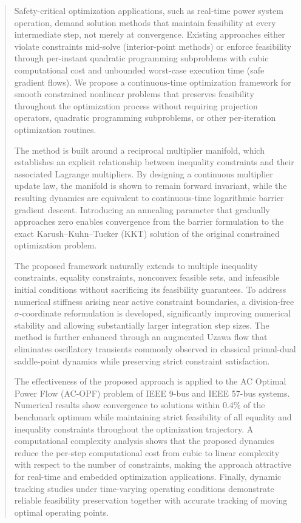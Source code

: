 \documentclass[11pt,onecolumn]{article}
\theoremstyle{definition}
\theoremstyle{remark}
\begin{document}
\begin{abstract}

Safety-critical optimization applications, such as real-time power system operation, demand solution methods that maintain feasibility at every intermediate step, not merely at convergence. Existing approaches either violate constraints mid-solve (interior-point methods) or enforce feasibility through per-instant quadratic programming subproblems with cubic computational cost and unbounded worst-case execution time (safe gradient flows). We propose a continuous-time optimization framework for smooth constrained nonlinear problems that preserves feasibility throughout the optimization process without requiring projection operators, quadratic programming subproblems, or other per-iteration optimization routines.


The method is built around a reciprocal multiplier manifold, which establishes an explicit relationship between inequality constraints and their associated Lagrange multipliers. By designing a continuous multiplier update law, the manifold is shown to remain forward invariant, while the resulting dynamics are equivalent to continuous-time logarithmic barrier gradient descent. Introducing an annealing parameter that gradually approaches zero enables convergence from the barrier formulation to the exact Karush–Kuhn–Tucker (KKT) solution of the original constrained optimization problem.

The proposed framework naturally extends to multiple inequality constraints, equality constraints, nonconvex feasible sets, and infeasible initial conditions without sacrificing its feasibility guarantees. To address numerical stiffness arising near active constraint boundaries, a division-free $\sigma$-coordinate reformulation is developed, significantly improving numerical stability and allowing substantially larger integration step sizes. The method is further enhanced through an augmented Uzawa flow that eliminates oscillatory transients commonly observed in classical primal-dual saddle-point dynamics while preserving strict constraint satisfaction. 

The effectiveness of the proposed approach is applied to the AC Optimal Power Flow (AC-OPF) problem of IEEE 9-bus and IEEE 57-bus  systems. Numerical results show convergence to solutions within 0.4\% of the benchmark optimum while maintaining strict feasibility of all equality and inequality constraints throughout the optimization trajectory. A computational complexity analysis shows that the proposed dynamics reduce the per-step computational cost from cubic to linear complexity with respect to the number of constraints, making the approach attractive for real-time and embedded optimization applications. Finally, dynamic tracking studies under time-varying operating conditions demonstrate reliable feasibility preservation together with accurate tracking of moving optimal operating points.


\end{abstract}
\end{document}
